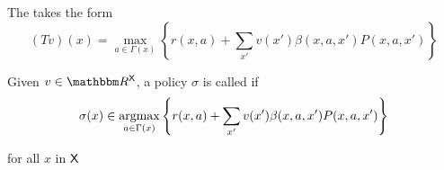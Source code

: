 \documentclass[xcolor=tex,dvipsnames]{beamer}
\begin{document}
\begin{frame}
    
    The  takes the form
    \begin{equation*}
        (Tv)(x) = \max_{a \in \Gamma(x)}
            \left\{
            r(x, a) + \sum_{x'} v(x') \beta(x, a, x') P(x, a, x')
        \right\}
    \end{equation*}
    

    \vspace{0.4em}
    \vspace{0.4em}

    \vspace{0.4em}
    Given $v \in \RR^\Xsf$, a policy $\sigma$ is called  if 
    \begin{equation*}
        \sigma(x) \in \argmax_{a \in \Gamma(x)}
        \left\{
            r(x, a) + \sum_{x'} v(x') \beta(x, a, x') P(x, a, x')
        \right\}
    \end{equation*}

     for all $x$ in $\mathsf X$



\end{frame}
\end{document}
